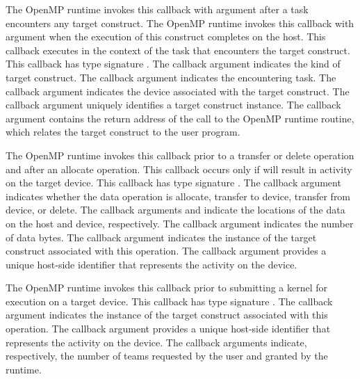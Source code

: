 \documentclass{article}
\begin{document}
\begin{description}

\item {}

The OpenMP runtime invokes this callback with argument  after a task encounters any target construct. 
The OpenMP runtime invokes this callback with argument  when the execution of this construct completes on the host. 
This callback executes in the context of the task that encounters the target construct.
This callback has type signature .
The callback argument  indicates the kind of target construct.
The callback argument  indicates the encountering task.
The callback argument  indicates the device associated with the target  construct.
The callback argument  uniquely identifies a target construct instance.
The  callback argument contains the return address of the call to the OpenMP runtime routine, which relates the target construct to the user program. 

\item {}

The OpenMP runtime invokes this callback prior to a transfer or delete operation and after an allocate operation. 
This callback occurs only if will result in activity on the target device.
This callback has type signature .
The callback argument  indicates  whether the data operation is allocate, transfer to device, transfer from device, or delete.
The callback arguments  and   indicate the locations of the data on the host and device, respectively.
The callback argument  indicates the number of data bytes.
The callback argument  indicates the instance of the target construct associated with this operation.
The callback argument  provides a unique host-side identifier that represents the activity on the device.

\item {}

The OpenMP runtime invokes this callback prior to submitting a kernel for execution on a target device. 
This callback has type signature .
The callback argument  indicates the instance of the target construct associated with this operation.
The callback argument  provides a unique host-side identifier that represents the activity on the device.
The callback arguments    indicate, respectively, the number of teams requested by the user and granted by the runtime.

\end{description}
\end{document}
